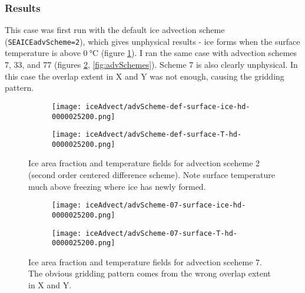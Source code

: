 \documentclass[11pt]{article}
\begin{document}
\subsubsection{Results}
This case was first run with the default ice advection scheme (\verb|SEAICEadvScheme=2|), which gives unphysical results - ice forms when the surface temperature is above $\SI{0}{\celsius}$ (figure \ref{fig:advScheme2}). I ran the same case with advection schemes 7, 33, and 77 (figures \ref{fig:advScheme7}, \ref{fig:advSchemes}). Scheme 7 is also clearly unphysical. In this case the overlap extent in X and Y was not enough, causing the gridding pattern.
\pagebreak

\clearpage

\begin{figure}[h!]
\centering
	\begin{subfigure}{0.85\textwidth}
		\texttt{[image: iceAdvect/advScheme-def-surface-ice-hd-0000025200.png]}
	\end{subfigure}
 
	\begin{subfigure}{0.85\textwidth}
		\texttt{[image: iceAdvect/advScheme-def-surface-T-hd-0000025200.png]}
	\end{subfigure}
\caption{Ice area fraction and temperature fields for advection sceheme 2 (second order centered difference scheme). Note surface temperature much above freezing where ice has newly formed.}
\label{fig:advScheme2}
\end{figure}

\begin{figure}[h!]
\centering
	\begin{subfigure}{0.85\textwidth}
		\texttt{[image: iceAdvect/advScheme-07-surface-ice-hd-0000025200.png]}
	\end{subfigure}
 
	\begin{subfigure}{0.85\textwidth}
		\texttt{[image: iceAdvect/advScheme-07-surface-T-hd-0000025200.png]}
	\end{subfigure}
\caption{Ice area fraction and temperature fields for advection sceheme 7. The obvious gridding pattern comes from the wrong overlap extent in X and Y.}
\label{fig:advScheme7}
\end{figure}

\clearpage
\end{document}
